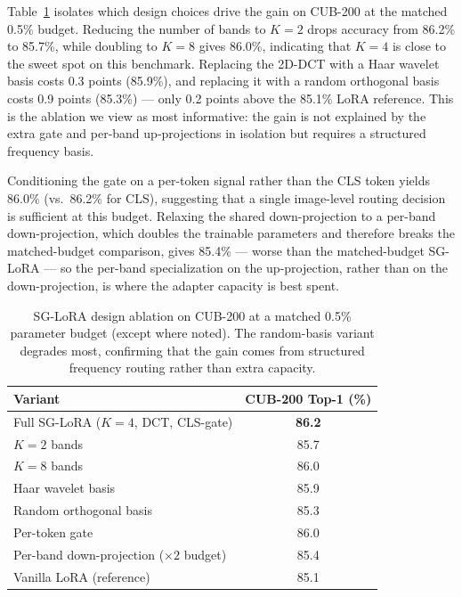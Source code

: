\documentclass{article}
\begin{document}
Table~\ref{tab:ablation} isolates which design choices drive the gain on CUB-200 at the matched 0.5\% budget. Reducing the number of bands to $K=2$ drops accuracy from 86.2\% to 85.7\%, while doubling to $K=8$ gives 86.0\%, indicating that $K=4$ is close to the sweet spot on this benchmark. Replacing the 2D-DCT with a Haar wavelet basis costs 0.3 points (85.9\%), and replacing it with a random orthogonal basis costs 0.9 points (85.3\%) --- only 0.2 points above the 85.1\% LoRA reference. This is the ablation we view as most informative: the gain is not explained by the extra gate and per-band up-projections in isolation but requires a structured frequency basis.

Conditioning the gate on a per-token signal rather than the CLS token yields 86.0\% (vs.\ 86.2\% for CLS), suggesting that a single image-level routing decision is sufficient at this budget. Relaxing the shared down-projection to a per-band down-projection, which doubles the trainable parameters and therefore breaks the matched-budget comparison, gives 85.4\% --- worse than the matched-budget SG-LoRA --- so the per-band specialization on the up-projection, rather than on the down-projection, is where the adapter capacity is best spent.

\begin{table}[t]
\centering
\caption{SG-LoRA design ablation on CUB-200 at a matched 0.5\% parameter budget (except where noted). The random-basis variant degrades most, confirming that the gain comes from structured frequency routing rather than extra capacity.}
\label{tab:ablation}
\small
\begin{tabular}{lc}
\toprule
Variant & CUB-200 Top-1 (\%) \\
\midrule
Full SG-LoRA ($K=4$, DCT, CLS-gate)        & \textbf{86.2} \\
$K=2$ bands                                 & 85.7 \\
$K=8$ bands                                 & 86.0 \\
Haar wavelet basis                          & 85.9 \\
Random orthogonal basis                     & 85.3 \\
Per-token gate                              & 86.0 \\
Per-band down-projection ($\times 2$ budget) & 85.4 \\
Vanilla LoRA (reference)                    & 85.1 \\
\bottomrule
\end{tabular}
\end{table}
\end{document}

